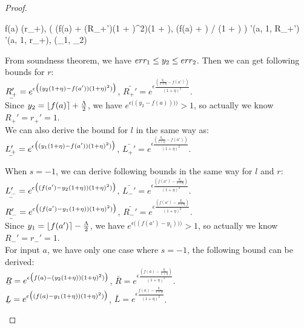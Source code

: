 \documentclass[a4paper,11pt]{article}
\begin{document}
\begin{proof}
\begin{itemize}
\begin{mathpar}
{{{{			\bigstep
			f(a) \oplus {} \otimes \oln (r_+), 
			\bigg(
			(f(a) + \ln(R_+')(1 + \eta)^2)(1 + \eta), 
			(f(a) + ) / (1 + \eta)
			\bigg)
		   }
		   {
		   \rsnap'(a, 1, R_+') \bigstep \fsnap'(a, 1, r_+), 
		   (\err_1, \err_2)
		   }
		  }
		 }
		}
		\end{mathpar}
		From soundness theorem, we have  $err_1 \leq y_2 \leq err_2$. Then we can get following bounds for $r$:\\
		$\ubar{R_+'} = e^{\epsilon 
				\big( (y_2(1 + \eta) - f(a')) (1 + \eta)^2) \big)}$, 
		$\bar{R_+'} = e^{\epsilon 
				\frac{(\frac{y_2}{1 + \eta} - f(a'))}{(1 + \eta)^2}}$.  
		\\
		Since $y_2 = \lfloor f(a) \rceil + \frac{\Lambda}{2}$, we have 
		$e^{\epsilon 
				\big( (y_2 - f(a))) \big)} > 1$, so actually we know $R_+' = r_+' = 1$.
		\\
		We can also derive the bound for $l$ in the same way as:\\
		$\ubar{L_+'} = e^{\epsilon 
				\big( (y_1(1 + \eta) - f(a')) (1 + \eta)^2) \big)}$, 
		$\bar{L_+'} = e^{\epsilon 
				\frac{(\frac{y_1}{1 + \eta} - f(a'))}{(1 + \eta)^2}}$.

		When $s = -1$, we can derive following bounds in the same way for $l$ and $r$:\\
		$\ubar{L_-'} = e^{\epsilon 
				\big( (f(a') - y_2(1 + \eta)) (1 + \eta)^2) \big)}$,
		$\bar{L_-'} = e^{\epsilon 
				\frac{(f(a') - \frac{y_2}{1 + \eta})}{(1 + \eta)^2}}$.\\
		$\ubar{R_-'} = e^{\epsilon 
				\big( (f(a') - y_1(1 + \eta)) (1 + \eta)^2) \big)}$, 
		$\bar{R_-'} = e^{\epsilon 
				\frac{(f(a') - \frac{y_1}{1 + \eta})}{(1 + \eta)^2}}$.\\
		Since $y_1 = \lfloor f(a') \rceil - \frac{\Lambda}{2}$, 
		we have $e^{\epsilon \big( (f(a') - y_1)) \big)} > 1$, so actually we know $R_-' = r_-' = 1$.
		\\
		For input $a$, we have only one case where $s = -1$, the following bound can be derived:
		\\
		$\ubar{R} = e^{\epsilon 
				\big( f(a) - (y_2(1 + \eta)) (1 + \eta)^2) \big)}$, 
		$\bar{R} = e^{\epsilon 
				\frac{(f(a) - \frac{y_2}{1 + \eta})}{(1 + \eta)^2}}$.  
		\\
		$\ubar{L} = e^{\epsilon 
				\big( (f(a) - y_1(1 + \eta)) (1 + \eta)^2) \big)}$, 
		$\bar{L} = e^{\epsilon 
				\frac{f(a) - \frac{y_1}{1 + \eta}}{(1 + \eta)^2}}$.


\end{itemize}
\end{proof}
\end{document}
